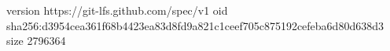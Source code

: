 version https://git-lfs.github.com/spec/v1
oid sha256:d3954cea361f68b4423ea83d8fd9a821c1ceef705c875192cefeba6d80d638d3
size 2796364
